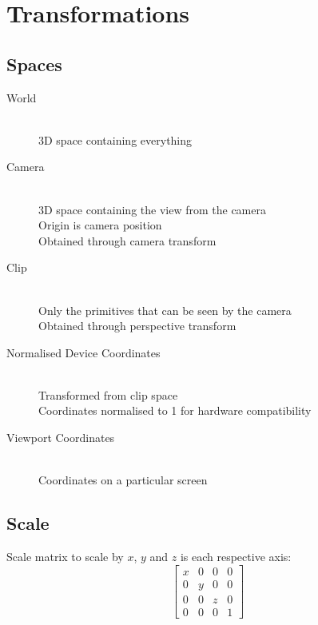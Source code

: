 \documentclass[a4paper]{article}
\begin{document}
\section{Transformations}
\label{sec:transformations}

\subsection{Spaces}

\begin{description}
  \item[World] \hfill \\
    3D space containing everything

  \item[Camera] \hfill \\
    3D space containing the view from the camera \\
    Origin is camera position \\
    Obtained through camera transform

  \item[Clip] \hfill \\
    Only the primitives that can be seen by the camera \\
    Obtained through perspective transform

  \item[Normalised Device Coordinates] \hfill \\
    Transformed from clip space \\
    Coordinates normalised to 1 for hardware compatibility

  \item[Viewport Coordinates] \hfill \\
    Coordinates on a particular screen

\end{description}

\subsection{Scale}

Scale matrix to scale by $x$, $y$ and $z$ is each respective axis:
\[
  \left [
    \begin{array}{cccc}
      x & 0 & 0 & 0 \\
      0 & y & 0 & 0 \\
      0 & 0 & z & 0 \\
      0 & 0 & 0 & 1
    \end{array}
  \right ]
\]
\end{document}
